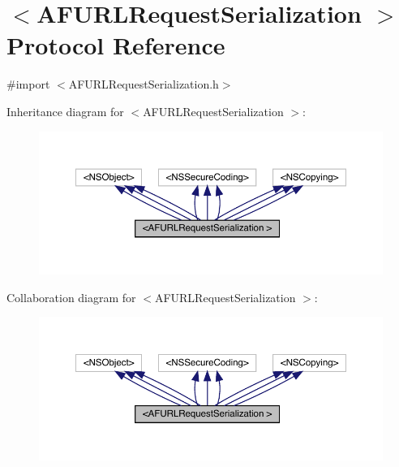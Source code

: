 \hypertarget{protocol_a_f_u_r_l_request_serialization_01-p}{}\section{$<$A\+F\+U\+R\+L\+Request\+Serialization $>$ Protocol Reference}
\label{protocol_a_f_u_r_l_request_serialization_01-p}


{\ttfamily \#import $<$A\+F\+U\+R\+L\+Request\+Serialization.\+h$>$}



Inheritance diagram for $<$A\+F\+U\+R\+L\+Request\+Serialization $>$\+:\nopagebreak
\begin{figure}[H]
\begin{center}
\leavevmode
\includegraphics[width=350pt]{protocol_a_f_u_r_l_request_serialization_01-p__inherit__graph}
\end{center}
\end{figure}


Collaboration diagram for $<$A\+F\+U\+R\+L\+Request\+Serialization $>$\+:\nopagebreak
\begin{figure}[H]
\begin{center}
\leavevmode
\includegraphics[width=350pt]{protocol_a_f_u_r_l_request_serialization_01-p__coll__graph}
\end{center}
\end{figure}
